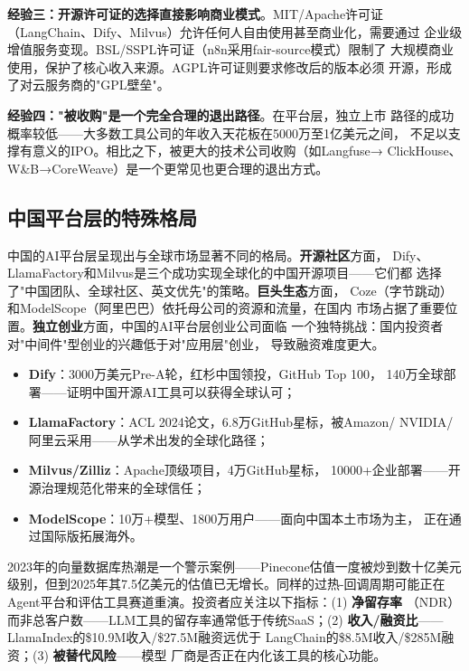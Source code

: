 \textbf{经验三：开源许可证的选择直接影响商业模式}。MIT/Apache许可证
（LangChain、Dify、Milvus）允许任何人自由使用甚至商业化，需要通过
企业级增值服务变现。BSL/SSPL许可证（n8n采用fair-source模式）限制了
大规模商业使用，保护了核心收入来源。AGPL许可证则要求修改后的版本必须
开源，形成了对云服务商的"GPL壁垒"。

\textbf{经验四："被收购"是一个完全合理的退出路径}。在平台层，独立上市
路径的成功概率较低——大多数工具公司的年收入天花板在5000万至1亿美元之间，
不足以支撑有意义的IPO。相比之下，被更大的技术公司收购（如Langfuse→
ClickHouse、W\&B→CoreWeave）是一个更常见也更合理的退出方式。

\subsection{中国平台层的特殊格局}

中国的AI平台层呈现出与全球市场显著不同的格局。\textbf{开源社区}方面，
Dify、LlamaFactory和Milvus是三个成功实现全球化的中国开源项目——它们都
选择了"中国团队、全球社区、英文优先"的策略。\textbf{巨头生态}方面，
Coze（字节跳动）和ModelScope（阿里巴巴）依托母公司的资源和流量，在国内
市场占据了重要位置。\textbf{独立创业}方面，中国的AI平台层创业公司面临
一个独特挑战：国内投资者对"中间件"型创业的兴趣低于对"应用层"创业，
导致融资难度更大。

\begin{corebox}[中国AI平台层的全球化路径]
\begin{itemize}
  \item \textbf{Dify}：3000万美元Pre-A轮，红杉中国领投，GitHub Top 100，
    140万全球部署——证明中国开源AI工具可以获得全球认可；
  \item \textbf{LlamaFactory}：ACL 2024论文，6.8万GitHub星标，被Amazon/
    NVIDIA/阿里云采用——从学术出发的全球化路径；
  \item \textbf{Milvus/Zilliz}：Apache顶级项目，4万GitHub星标，
    10000+企业部署——开源治理规范化带来的全球信任；
  \item \textbf{ModelScope}：10万+模型、1800万用户——面向中国本土市场为主，
    正在通过国际版拓展海外。
\end{itemize}
\end{corebox}

\begin{warnbox}
2023年的向量数据库热潮是一个警示案例——Pinecone估值一度被炒到数十亿美元
级别，但到2025年其7.5亿美元的估值已无增长。同样的过热-回调周期可能正在
Agent平台和评估工具赛道重演。投资者应关注以下指标：(1) \textbf{净留存率}
（NDR）而非总客户数——LLM工具的留存率通常低于传统SaaS；(2)
\textbf{收入/融资比}——LlamaIndex的\$10.9M收入/\$27.5M融资远优于
LangChain的\$8.5M收入/\$285M融资；(3) \textbf{被替代风险}——模型
厂商是否正在内化该工具的核心功能。
\end{warnbox}

